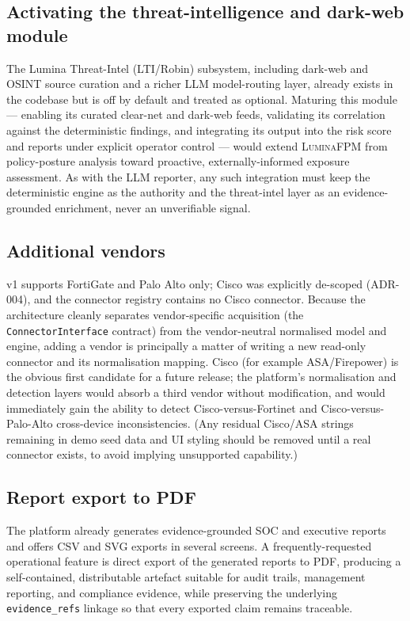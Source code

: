 \subsection{Activating the threat-intelligence and dark-web module}
\label{sec:ch5-lti}

The Lumina Threat-Intel (LTI/Robin) subsystem, including dark-web and OSINT source curation and a richer LLM model-routing layer, already exists in the codebase but is off by default and treated as optional. Maturing this module --- enabling its curated clear-net and dark-web feeds, validating its correlation against the deterministic findings, and integrating its output into the risk score and reports under explicit operator control --- would extend \textsc{LuminaFPM} from policy-posture analysis toward proactive, externally-informed exposure assessment. As with the LLM reporter, any such integration must keep the deterministic engine as the authority and the threat-intel layer as an evidence-grounded enrichment, never an unverifiable signal.

\subsection{Additional vendors}
\label{sec:ch5-vendors}

v1 supports FortiGate and Palo Alto only; Cisco was explicitly de-scoped (ADR-004), and the connector registry contains no Cisco connector. Because the architecture cleanly separates vendor-specific acquisition (the \texttt{ConnectorInterface} contract) from the vendor-neutral normalised model and engine, adding a vendor is principally a matter of writing a new read-only connector and its normalisation mapping. Cisco (for example ASA/Firepower) is the obvious first candidate for a future release; the platform's normalisation and detection layers would absorb a third vendor without modification, and would immediately gain the ability to detect Cisco-versus-Fortinet and Cisco-versus-Palo-Alto cross-device inconsistencies. (Any residual Cisco/ASA strings remaining in demo seed data and UI styling should be removed until a real connector exists, to avoid implying unsupported capability.)

\subsection{Report export to PDF}
\label{sec:ch5-pdf}

The platform already generates evidence-grounded SOC and executive reports and offers CSV and SVG exports in several screens. A frequently-requested operational feature is direct export of the generated reports to PDF, producing a self-contained, distributable artefact suitable for audit trails, management reporting, and compliance evidence, while preserving the underlying \texttt{evidence\_refs} linkage so that every exported claim remains traceable.

